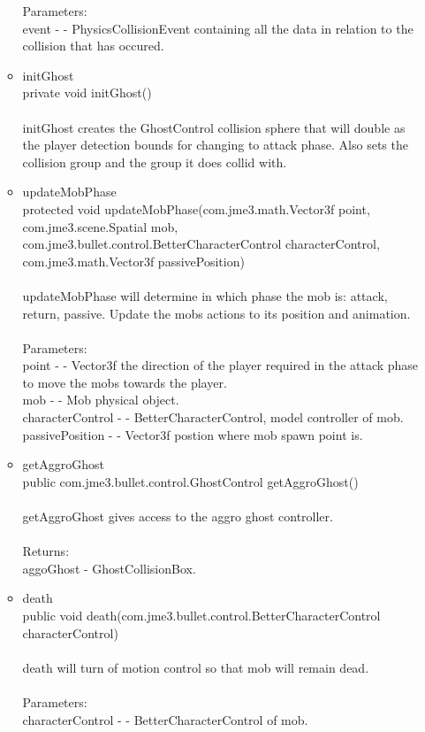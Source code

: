 \documentclass[letterpaper]{article}
\begin{document}
\begin{itemize}
\begin{itemize}
											Parameters: \\
											event - - PhysicsCollisionEvent containing all the data in relation to the collision that has occured. \\
									\item	initGhost \\
											private void initGhost() \\ \\
											initGhost creates the GhostControl collision sphere that will double as the player detection bounds for changing to attack phase. Also sets the collision group and the group it does collid with.
									\item	updateMobPhase \\
											protected void updateMobPhase(com.jme3.math.Vector3f point, \\
		                  com.jme3.scene.Spatial mob, \\
		                  com.jme3.bullet.control.BetterCharacterControl characterControl, \\
		                  com.jme3.math.Vector3f passivePosition) \\ \\
											updateMobPhase will determine in which phase the mob is: attack, return, passive. Update the mobs actions to its position and animation. \\ \\
											Parameters: \\
											point - - Vector3f the direction of the player required in the attack phase to move the mobs towards the player. \\
											mob - - Mob physical object. \\
											characterControl - - BetterCharacterControl, model controller of mob. \\
											passivePosition - - Vector3f postion where mob spawn point is.
									\item	getAggroGhost \\
											public com.jme3.bullet.control.GhostControl getAggroGhost() \\ \\
											getAggroGhost gives access to the aggro ghost controller. \\ \\
											Returns: \\
											aggoGhost - GhostCollisionBox. \\
									\item	death \\
											public void death(com.jme3.bullet.control.BetterCharacterControl characterControl) \\ \\
											death will turn of motion control so that mob will remain dead. \\ \\
											Parameters: \\
											characterControl - - BetterCharacterControl of mob. \\
								\end{itemize}
					\end{itemize}
					
\end{document}
